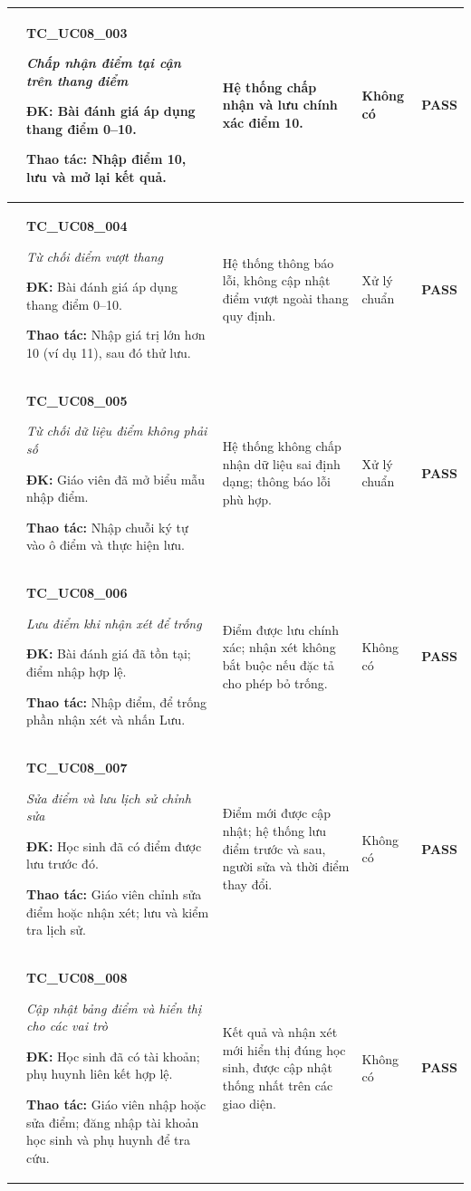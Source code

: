 \begin{longtable}{|>{\centering\arraybackslash}p{0.8cm}|>{\raggedright\arraybackslash}p{4.6cm}|>{\raggedright\arraybackslash}p{3.8cm}|>{\raggedright\arraybackslash}p{3.8cm}|>{\centering\arraybackslash}p{1.5cm}|}
3 & \textbf{TC\_UC08\_003}\par \textit{Chấp nhận điểm tại cận trên thang điểm}\par \textbf{ĐK:} Bài đánh giá áp dụng thang điểm 0--10.\par \textbf{Thao tác:} Nhập điểm 10, lưu và mở lại kết quả. & Hệ thống chấp nhận và lưu chính xác điểm 10. & Không có & \textbf{PASS} \\ \hline
4 & \textbf{TC\_UC08\_004}\par \textit{Từ chối điểm vượt thang}\par \textbf{ĐK:} Bài đánh giá áp dụng thang điểm 0--10.\par \textbf{Thao tác:} Nhập giá trị lớn hơn 10 (ví dụ 11), sau đó thử lưu. & Hệ thống thông báo lỗi, không cập nhật điểm vượt ngoài thang quy định. & Xử lý chuẩn & \textbf{PASS} \\ \hline
5 & \textbf{TC\_UC08\_005}\par \textit{Từ chối dữ liệu điểm không phải số}\par \textbf{ĐK:} Giáo viên đã mở biểu mẫu nhập điểm.\par \textbf{Thao tác:} Nhập chuỗi ký tự vào ô điểm và thực hiện lưu. & Hệ thống không chấp nhận dữ liệu sai định dạng; thông báo lỗi phù hợp. & Xử lý chuẩn & \textbf{PASS} \\ \hline
6 & \textbf{TC\_UC08\_006}\par \textit{Lưu điểm khi nhận xét để trống}\par \textbf{ĐK:} Bài đánh giá đã tồn tại; điểm nhập hợp lệ.\par \textbf{Thao tác:} Nhập điểm, để trống phần nhận xét và nhấn Lưu. & Điểm được lưu chính xác; nhận xét không bắt buộc nếu đặc tả cho phép bỏ trống. & Không có & \textbf{PASS} \\ \hline
7 & \textbf{TC\_UC08\_007}\par \textit{Sửa điểm và lưu lịch sử chỉnh sửa}\par \textbf{ĐK:} Học sinh đã có điểm được lưu trước đó.\par \textbf{Thao tác:} Giáo viên chỉnh sửa điểm hoặc nhận xét; lưu và kiểm tra lịch sử. & Điểm mới được cập nhật; hệ thống lưu điểm trước và sau, người sửa và thời điểm thay đổi. & Không có & \textbf{PASS} \\ \hline
8 & \textbf{TC\_UC08\_008}\par \textit{Cập nhật bảng điểm và hiển thị cho các vai trò}\par \textbf{ĐK:} Học sinh đã có tài khoản; phụ huynh liên kết hợp lệ.\par \textbf{Thao tác:} Giáo viên nhập hoặc sửa điểm; đăng nhập tài khoản học sinh và phụ huynh để tra cứu. & Kết quả và nhận xét mới hiển thị đúng học sinh, được cập nhật thống nhất trên các giao diện. & Không có & \textbf{PASS} \\ \hline

\end{longtable}
